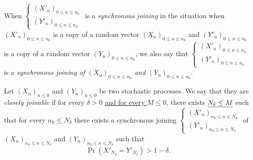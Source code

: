 \documentclass[12pt,a4paper]{article}
\begin{document}
When $\left\{\begin{smallmatrix} {(X'_n)}_{0 \leq n \leq n_0} \\ 
{(Y'_n)}_{0 \leq n \leq n_0}
\end{smallmatrix}\right.$  is a \emph{synchronous joining} in the situation when 
${(X'_n)}_{0 \leq n \leq n_0}$ is a copy of a random vector 
${(X_n)}_{0 \leq n \leq n_0}$  and ${(Y'_n)}_{0 \leq n \leq n_0}$ 
is a copy of a random vector ${(Y_n)}_{0 \leq n \leq n_0}$, we also say that 
$\left\{\begin{smallmatrix} {(X'_n)}_{0 \leq n \leq n_0} \\ 
{(Y'_n)}_{0 \leq n \leq n_0}
\end{smallmatrix}\right.$  is a \emph{synchronous joining of 
${(X_n)}_{0 \leq n \leq n_0}$ and ${(Y_n)}_{0 \leq n \leq n_0}$}. 


\begin{definition}\label{def:joinable}
Let ${(X_n)}_{n \leq 0}$ and ${(Y_n)}_{n \leq 0}$ be two stochastic processes. 
We say that they are \emph{closely joinable} if for every $\delta >0$ 
\uline{and for every $M\leq 0$}, there exists 
$\uline{N_\delta \leq M}$ such that for every $n_0 \leq N_\delta$ there exists a 
synchronous joining $\left\{\begin{smallmatrix} {(X'_n)}_{n_0 \leq n \leq N_\delta} \\ 
{(Y'_n)}_{n_0 \leq n \leq N_\delta}
\end{smallmatrix}\right.$ 
of ${(X_n)}_{n_0 \leq n \leq N_\delta}$ and ${(Y_n)}_{n_0 \leq n \leq N_\delta}$ 
such that 
$$
\Pr(X'_{N_\delta}=Y'_{N_\delta}) > 1-\delta. 
$$ 
\end{definition}
\end{document}
